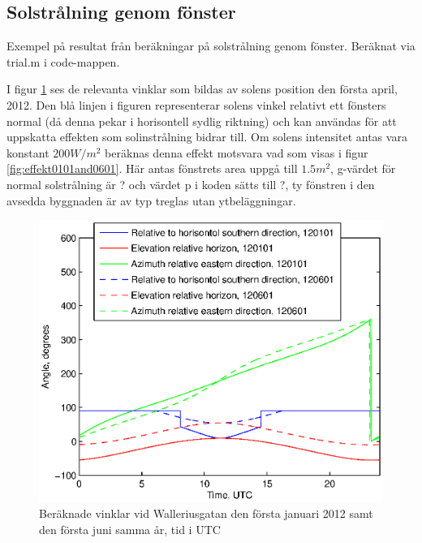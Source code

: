 \subsection{Solstrålning genom fönster}

Exempel på resultat från beräkningar på solstrålning genom fönster. Beräknat via trial.m i code-mappen.

I figur \ref{fig:sun0101and0601} ses de relevanta vinklar som bildas av solens position den första april, 2012. Den blå linjen i figuren representerar solens vinkel relativt ett fönsters normal (då denna pekar i horisontell sydlig riktning) och kan användas för att uppskatta effekten som solinstrålning bidrar till. Om solens intensitet antas vara konstant $\unit{200}{W/m^2}$ beräknas denna effekt motsvara vad som visas i figur \ref{fig:effekt0101and0601}. Här antas fönstrets area uppgå till $\unit{1.5}{m^2}$, g-värdet för normal solstrålning är ? och värdet p i koden sätts till ?, ty fönstren i den avsedda byggnaden är av typ treglas utan ytbeläggningar.

\begin{figure}[hpbt]
\centering
\includegraphics[scale=1]{images/sun0101and0601.eps}
\caption{\label{fig:sun0101and0601} Beräknade vinklar vid Walleriusgatan den första januari 2012 samt den första juni samma år, tid i UTC}
\end{figure}

